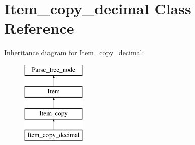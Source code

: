 \hypertarget{classItem__copy__decimal}{}\section{Item\+\_\+copy\+\_\+decimal Class Reference}
\label{classItem__copy__decimal}
Inheritance diagram for Item\+\_\+copy\+\_\+decimal\+:\begin{figure}[H]
\begin{center}
\leavevmode
\includegraphics[height=4.000000cm]{classItem__copy__decimal}
\end{center}
\end{figure}
